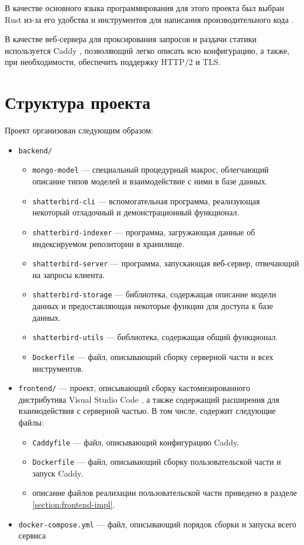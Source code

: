 В качестве основного языка программирования для этого проекта был выбран Rust из-за его удобства и инструментов для написания производительного кода \cite{trpl}.

В качестве веб-сервера для проксирования запросов и раздачи статики используется Caddy \cite{Caddy}, позволяющий легко описать всю конфигурацию, а также, при необходимости, обеспечить поддержку HTTP/2 и TLS.

\section{Структура проекта}

Проект организован следующим образом:
\begin{itemize}
    \item \texttt{backend/}
        \begin{itemize}
            \item \texttt{mongo-model} — специальный процедурный макрос, облегчающий описание типов моделей и взаимодействие с ними в базе данных.
            \item \texttt{shatterbird-cli} — вспомогательная программа, реализующая некоторый отладочный и демонстрационный функционал.
            \item \texttt{shatterbird-indexer} — программа, загружающая данные об индексируемом репозитории в хранилище.
            \item \texttt{shatterbird-server} — программа, запускающая веб-сервер, отвечающий на запросы клиента.
            \item \texttt{shatterbird-storage} — библиотека, содержащая описание модели данных и предоставляющая некоторые функции для доступа к базе данных. 
            \item \texttt{shatterbird-utils} — библиотека, содержащая общий функционал.
            \item \texttt{Dockerfile} — файл, описывающий сборку серверной части и всех инструментов.
        \end{itemize}
    \item \texttt{frontend/} — проект, описывающий сборку кастомизированного дистрибутива Visual Studio Code \cite{vscode}, а также содержащий расширения для взаимодействия с серверной частью. В том числе, содержит следующие файлы:
        \begin{itemize}
            \item \texttt{Caddyfile} — файл, описывающий конфигурацию Caddy.
            \item \texttt{Dockerfile} — файл, описывающий сборку пользовательской части и запуск Caddy.
            \item описание файлов реализации пользовательской части приведено в разделе \ref{section:frontend-impl}.
        \end{itemize}
    \item \texttt{docker-compose.yml} — файл, описывающий порядок сборки и запуска всего сервиса
\end{itemize}


